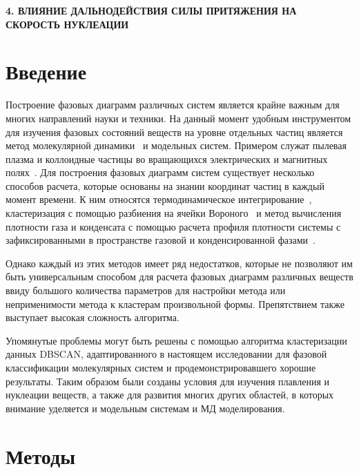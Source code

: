 \newpage
\begin{center}
  \textbf{\large 4. ВЛИЯНИЕ ДАЛЬНОДЕЙСТВИЯ СИЛЫ ПРИТЯЖЕНИЯ НА СКОРОСТЬ НУКЛЕАЦИИ}
\end{center}

\section{Введение}
\label{PRIMe-SecIntroduction}

Построение фазовых диаграмм различных систем является крайне важным для многих направлений науки и техники.
На данный момент удобным инструментом для изучения фазовых состояний веществ на уровне отдельных частиц является метод молекулярной динамики~\cite{10.1063/1.1730376, 10.1006/jcph.1995.1039} и модельных систем.
Примером служат пылевая плазма и коллоидные частицы во вращающихся электрических и магнитных полях~\cite{10.1038/s41598-017-14001-y, 10.1103/physreve.103.022608, 10.1103/physreve.96.043201}.
Для построения фазовых диаграмм систем существует несколько способов расчета, которые основаны на знании координат частиц в каждый момент времени.
К ним относятся термодинамическое интегрирование~\cite{10.1088/0953-8984/21/46/465104}, кластеризация с помощью разбиения на ячейки Вороного~\cite{10.1021/acs.jpcc.7b09317} и метод вычисления плотности газа и конденсата с помощью расчета профиля плотности системы с зафиксированными в пространстве газовой и конденсированной фазами~\cite{10.1021/jp806127j, 10.1021/jp1117213}.

Однако каждый из этих методов имеет ряд недостатков, которые не позволяют им быть универсальным способом для расчета фазовых диаграмм различных веществ ввиду большого количества параметров для настройки метода или неприменимости метода к кластерам произвольной формы.
Препятствием также выступает высокая сложность алгоритма.

Упомянутые проблемы могут быть решены с помощью алгоритма кластеризации данных DBSCAN, адаптированного в настоящем исследовании для фазовой классификации молекулярных систем и продемонстрировавшего хорошие результаты.
Таким образом были созданы условия для изучения плавления и нуклеации веществ, а также для развития многих других областей, в которых внимание уделяется и модельным системам и МД моделирования.


\section{Методы}
\label{PRIMe-SecMethods}


